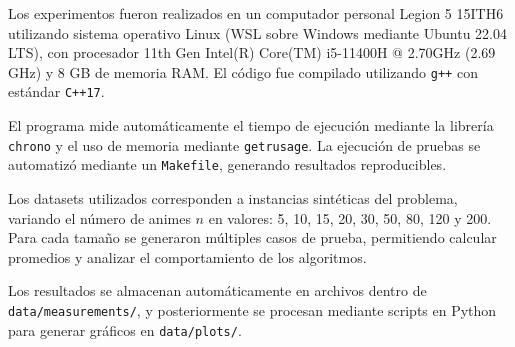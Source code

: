 Los experimentos fueron realizados en un computador personal Legion 5 15ITH6 utilizando sistema operativo Linux (WSL sobre Windows mediante Ubuntu 22.04 LTS), con procesador 11th Gen Intel(R) Core(TM) i5-11400H @ 2.70GHz (2.69 GHz) y 8 GB de memoria RAM. El código fue compilado utilizando \texttt{g++} con estándar \texttt{C++17}.

El programa mide automáticamente el tiempo de ejecución mediante la librería \texttt{chrono} y el uso de memoria mediante \texttt{getrusage}. La ejecución de pruebas se automatizó mediante un \texttt{Makefile}, generando resultados reproducibles.

Los datasets utilizados corresponden a instancias sintéticas del problema, variando el número de animes \(n\) en valores: 5, 10, 15, 20, 30, 50, 80, 120 y 200. Para cada tamaño se generaron múltiples casos de prueba, permitiendo calcular promedios y analizar el comportamiento de los algoritmos.

Los resultados se almacenan automáticamente en archivos dentro de \texttt{data/measurements/}, y posteriormente se procesan mediante scripts en Python para generar gráficos en \texttt{data/plots/}.
